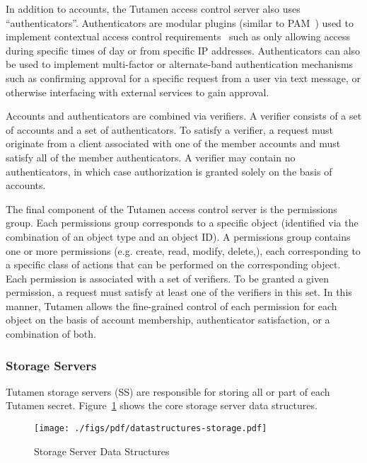 In addition to accounts, the Tutamen access control server also uses
``authenticators''. Authenticators are modular plugins (similar to
PAM~\cite{samar1996}) used to implement contextual access control
requirements~\cite{hulsebosch2005} such as only allowing access during
specific times of day or from specific IP addresses. Authenticators
can also be used to implement multi-factor or alternate-band
authentication mechanisms such as confirming approval for a specific
request from a user via text message, or otherwise interfacing with
external services to gain approval.

Accounts and authenticators are combined via verifiers. A verifier
consists of a set of accounts and a set of authenticators. To satisfy
a verifier, a request must originate from a client associated with one
of the member accounts and must satisfy all of the member
authenticators. A verifier may contain no authenticators, in which
case authorization is granted solely on the basis of accounts.

The final component of the Tutamen access control server is the
permissions group. Each permissions group corresponds to a specific
object (identified via the combination of an object type and an object
ID). A permissions group contains one or more permissions
(e.g. create, read, modify, delete,), each corresponding to a specific
class of actions that can be performed on the corresponding
object. Each permission is associated with a set of verifiers. To be
granted a given permission, a request must satisfy at least one of the
verifiers in this set. In this manner, Tutamen allows the fine-grained
control of each permission for each object on the basis of account
membership, authenticator satisfaction, or a combination of both.

\subsubsection{Storage Servers}
\label{sec:tutamen:arch:ss}

Tutamen storage servers (SS) are responsible for storing all or part
of each Tutamen secret. Figure~\ref{fig:tutamen:storagestructs} shows
the core storage server data structures.

\begin{figure}[th]
  \centering
  \texttt{[image: ./figs/pdf/datastructures-storage.pdf]}
  \caption{Storage Server Data Structures}
  \label{fig:tutamen:storagestructs}
\end{figure}

